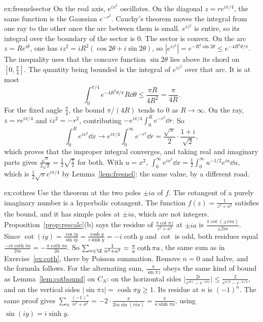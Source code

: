 \begin{solution}{ex:fresnelsector}
\idea On the real axis, $e^{ix^2}$ oscillates. On the diagonal $z=re^{i\pi/4}$, the same function is the Gaussian $e^{-r^2}$. Cauchy's theorem moves the integral from one ray to the other once the arc between them is small.
\writeup $e^{iz^2}$ is entire, so its integral over the boundary of the sector is $0$. The sector is convex. On the arc $z=Re^{i\theta}$, one has $iz^2=iR^2(\cos2\theta+i\sin2\theta)$, so
$|e^{iz^2}|=e^{-R^2\sin2\theta}\le e^{-4R^2\theta/\pi}$. The inequality uses that the concave function $\sin2\theta$ lies above its chord on $[0,\frac\pi4]$. The quantity being bounded is the integral of $e^{iz^2}$ over that arc. It is at most
\[
\int_0^{\pi/4}e^{-4R^2\theta/\pi}R\dd\theta\le\frac{\pi R}{4R^2}=\frac\pi{4R}.
\]
For the fixed angle $\frac\pi4$, the bound $\pi/(4R)$ tends to $0$ as $R\to\infty$. On the ray, $z=re^{i\pi/4}$ and $iz^2=-r^2$, contributing $-e^{i\pi/4}\int_0^Re^{-r^2}\dd r$. So
\[
\int_0^Re^{ix^2}\dd x\longrightarrow e^{i\pi/4}\int_0^\infty e^{-r^2}\dd r=\frac{\sqrt\pi}2\cdot\frac{1+i}{\sqrt2},
\]
which proves that the improper integral converges, and taking real and imaginary parts gives $\frac{\sqrt\pi}{2\sqrt2}=\frac12\sqrt{\frac\pi2}$ for both. With $u=x^2$,
$\int_0^\infty e^{ix^2}\dd x=\frac12\int_0^\infty u^{-1/2}e^{iu}\dd u$, which is $\frac12\sqrt\pi e^{i\pi/4}$ by Lemma~\ref{lem:fresnel}: the same value, by a different road.
\end{solution}

\begin{solution}{ex:cothres}
\idea Use the theorem at the two poles $\pm ia$ of $f$. The cotangent of a purely imaginary number is a hyperbolic cotangent.
\writeup The function $f(z)=\frac1{z^2+a^2}$ satisfies the bound, and it has simple poles at $\pm ia$, which are not integers. Proposition~\ref{prop:rescalc}(b) says the residue of $\frac{\pi\cot\pi z}{z^2+a^2}$ at $\pm ia$ is $\frac{\pi\cot(\pm i\pi a)}{\pm2ia}$. Since $\cot(iy)=\frac{\cos iy}{\sin iy}=\frac{\cosh y}{i\sinh y}=-i\coth y$ and $\cot$ is odd, both residues equal $\frac{-i\pi\coth\pi a}{2ia}=-\frac{\pi\coth\pi a}{2a}$. So $\sum_{n\in\Z}\frac1{n^2+a^2}=\frac\pi a\coth\pi a$, the same sum as in Exercise~\ref{ex:coth}, there by Poisson summation. Remove $n=0$ and halve, and the formula follows. For the alternating sum, $\frac\pi{\sin\pi z}$ obeys the same kind of bound as Lemma~\ref{lem:cotbound} on $C_N$: on the horizontal sides $\bigl|\frac{2i}{e^{i\pi z}-e^{-i\pi z}}\bigr|\le\frac2{e^{\pi/2}-e^{-\pi/2}}$, and on the vertical sides $|\sin\pi z|=\cosh\pi y\ge1$. Its residue at $n$ is $(-1)^n$. The same proof gives $\sum_n\frac{(-1)^n}{n^2+a^2}=-2\cdot\frac{\pi}{2ia\sin(i\pi a)}=\frac\pi{a\sinh\pi a}$, using $\sin(iy)=i\sinh y$.
\end{solution}

